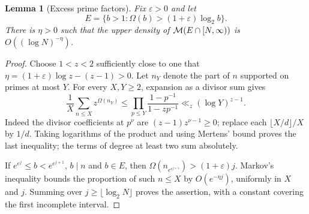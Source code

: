 \documentclass[11pt,a4paper]{article}
\newtheorem{lemma}[theorem]{Lemma}
\newcommand{\Om}{\Omega}
\begin{document}
\begin{lemma}[Excess prime factors]\label{tails}
Fix $\varepsilon>0$ and let
\[
 E=\{b>1:\Om(b)>(1+\varepsilon)\log_2b\}.
\]
There is $\eta>0$ such that the upper density of
${\cal M}(E\cap[N,\infty))$ is $O((\log N)^{-\eta})$.
\end{lemma}
\begin{proof}
Choose $1<z<2$ sufficiently close to one that
$\eta=(1+\varepsilon)\log z-(z-1)>0$.
Let $n_Y$ denote the part of $n$ supported on primes at most $Y$.
For every $X,Y\ge2$, expansion as a divisor sum gives
\[
 \frac1X\sum_{n\le X}z^{\Om(n_Y)}
 \le\prod_{p\le Y}\frac{1-p^{-1}}{1-zp^{-1}}
 \ll_z (\log Y)^{z-1}.
\]
Indeed the divisor coefficients at $p^\nu$ are
$(z-1)z^{\nu-1}\ge0$; replace each $\lfloor X/d\rfloor/X$ by $1/d$.
Taking logarithms of the product and using Mertens' bound proves the
last inequality; the terms of degree at least two sum absolutely.

If $e^{e^j}\le b<e^{e^{j+1}}$, $b\mid n$ and $b\in E$, then
$\Om(n_{e^{e^{j+1}}})>(1+\varepsilon)j$. Markov's inequality
bounds the proportion of such $n\le X$ by $O(e^{-\eta j})$,
uniformly in $X$ and $j$. Summing over
$j\ge\lfloor\log_2N\rfloor$ proves the assertion, with a constant
covering the first incomplete interval.
\end{proof}
\end{document}
